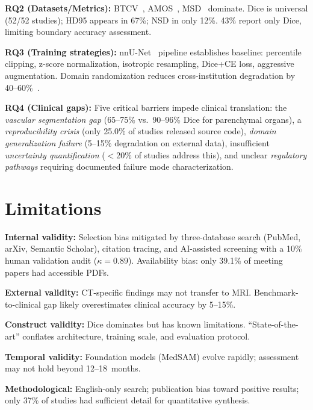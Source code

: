 \documentclass[conference]{IEEEtran}
\begin{document}
\textbf{RQ2 (Datasets/Metrics):} BTCV~\cite{btcv2015}, AMOS~\cite{amos2022}, MSD~\cite{msd2022} dominate. Dice is universal (52/52 studies); HD95 appears in 67\%; NSD in only 12\%. 43\% report only Dice, limiting boundary accuracy assessment.

\textbf{RQ3 (Training strategies):} nnU-Net~\cite{isensee2021nnunet} pipeline establishes baseline: percentile clipping, z-score normalization, isotropic resampling, Dice+CE loss, aggressive augmentation. Domain randomization reduces cross-institution degradation by 40--60\%~\cite{isensee2021nnunet, wasserthal2023totalsegmentator}.

\textbf{RQ4 (Clinical gaps):} Five critical barriers impede clinical translation: the \emph{vascular segmentation gap} (65--75\% vs.\ 90--96\% Dice for parenchymal organs), a \emph{reproducibility crisis} (only 25.0\% of studies released source code), \emph{domain generalization failure} (5--15\% degradation on external data), insufficient \emph{uncertainty quantification} ($<$20\% of studies address this), and unclear \emph{regulatory pathways} requiring documented failure mode characterization.

\section{Limitations}
\label{sec:limitations}

\textbf{Internal validity:} Selection bias mitigated by three-database search (PubMed, arXiv, Semantic Scholar), citation tracing, and AI-assisted screening with a 10\% human validation audit ($\kappa = 0.89$). Availability bias: only 39.1\% of meeting papers had accessible PDFs.

\textbf{External validity:} CT-specific findings may not transfer to MRI. Benchmark-to-clinical gap likely overestimates clinical accuracy by 5--15\%.

\textbf{Construct validity:} Dice dominates but has known limitations. ``State-of-the-art'' conflates architecture, training scale, and evaluation protocol.

\textbf{Temporal validity:} Foundation models (MedSAM) evolve rapidly; assessment may not hold beyond 12--18~months.

\textbf{Methodological:} English-only search; publication bias toward positive results; only 37\% of studies had sufficient detail for quantitative synthesis.
\end{document}
